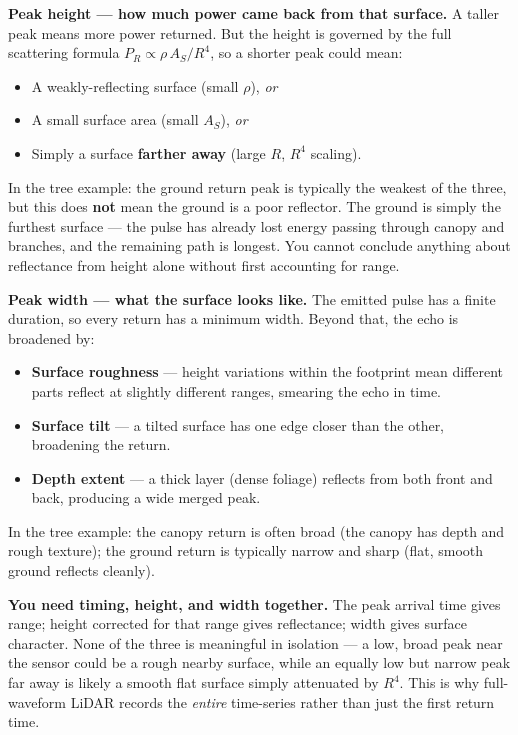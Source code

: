 \documentclass[12pt, a4paper]{article}
\begin{document}
\textbf{Peak height --- how much power came back from that surface.}
A taller peak means more power returned.  But the height is governed
by the full scattering formula $P_R \propto \rho\, A_S / R^4$, so a
shorter peak could mean:
\begin{itemize}[leftmargin=1.2em,itemsep=2pt]
  \item A weakly-reflecting surface (small $\rho$), \emph{or}
  \item A small surface area (small $A_S$), \emph{or}
  \item Simply a surface \textbf{farther away} (large $R$, $R^4$
    scaling).
\end{itemize}
In the tree example: the ground return peak is typically the weakest
of the three, but this does \textbf{not} mean the ground is a poor
reflector.  The ground is simply the furthest surface --- the pulse
has already lost energy passing through canopy and branches, and the
remaining path is longest.  You cannot conclude anything about
reflectance from height alone without first accounting for range.

\textbf{Peak width --- what the surface looks like.}
The emitted pulse has a finite duration, so every return has a minimum
width.  Beyond that, the echo is broadened by:
\begin{itemize}[leftmargin=1.2em,itemsep=2pt]
  \item \textbf{Surface roughness} --- height variations within the
    footprint mean different parts reflect at slightly different ranges,
    smearing the echo in time.
  \item \textbf{Surface tilt} --- a tilted surface has one edge closer
    than the other, broadening the return.
  \item \textbf{Depth extent} --- a thick layer (dense foliage) reflects
    from both front and back, producing a wide merged peak.
\end{itemize}
In the tree example: the canopy return is often broad (the canopy has
depth and rough texture); the ground return is typically narrow and
sharp (flat, smooth ground reflects cleanly).

\textbf{You need timing, height, and width together.}
The peak arrival time gives range; height corrected for that range gives
reflectance; width gives surface character.  None of the three is
meaningful in isolation --- a low, broad peak near the sensor could
be a rough nearby surface, while an equally low but narrow peak far
away is likely a smooth flat surface simply attenuated by $R^4$.
This is why full-waveform LiDAR records the \emph{entire} time-series
rather than just the first return time.
\end{document}

